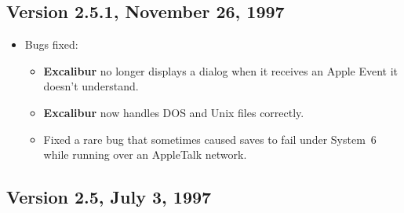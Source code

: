 \documentclass[11pt,titlepage]{article}
\newcommand{\ex}{\textbf{Excalibur}}
\begin{document}
\subsection{Version 2.5.1, November 26, 1997}

\begin{itemize}

\item Bugs fixed:

  \begin{itemize}

  \item \ex{} no longer displays a dialog when it receives an Apple
    Event it doesn't understand.

  \item \ex{} now handles DOS and Unix files correctly.

  \item Fixed a rare bug that sometimes caused saves to fail under
    System~6 while running over an AppleTalk network.

  \end{itemize}

\end{itemize}

\subsection{Version 2.5, July 3, 1997}
\end{document}
